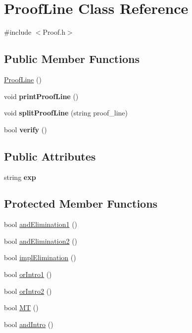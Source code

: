 \hypertarget{classProofLine}{}\section{Proof\+Line Class Reference}
\label{classProofLine}


{\ttfamily \#include $<$Proof.\+h$>$}

\subsection*{Public Member Functions}
\begin{DoxyCompactItemize}
\item 
\hyperlink{classProofLine_aed683fe67d959f3b95f8975e80b23d66}{Proof\+Line} ()
\item 
\mbox{\label{classProofLine_a3513b1868553c12d6f543d2ac52128d0}} 
void {\bfseries print\+Proof\+Line} ()
\item 
\mbox{\label{classProofLine_a0852f21558cab79bdcaec616afdb02c0}} 
void {\bfseries split\+Proof\+Line} (string proof\+\_\+line)
\item 
\mbox{\label{classProofLine_a6f98427e3d814f8d122e729a427afeee}} 
bool {\bfseries verify} ()
\end{DoxyCompactItemize}
\subsection*{Public Attributes}
\begin{DoxyCompactItemize}
\item 
\mbox{\label{classProofLine_a7e1c27891418bad97d7e0ead18438973}} 
string {\bfseries exp}
\end{DoxyCompactItemize}
\subsection*{Protected Member Functions}
\begin{DoxyCompactItemize}
\item 
bool \hyperlink{classProofLine_a43b9c81f4f9be5f00343f5145110e075}{and\+Elimination1} ()
\item 
bool \hyperlink{classProofLine_a0bda4d97d283bf87f0c97415ede20e37}{and\+Elimination2} ()
\item 
bool \hyperlink{classProofLine_ae5ea0ef5e9c41064af3d8578af1f8da0}{impl\+Elimination} ()
\item 
bool \hyperlink{classProofLine_aec5ed54b54b88fb6e1a28dc81e95c670}{or\+Intro1} ()
\item 
bool \hyperlink{classProofLine_af445475b7ba7083bc67b3066dbfefc95}{or\+Intro2} ()
\item 
bool \hyperlink{classProofLine_abbc92e738aea8f3aa60a2b252ebfb9c6}{MT} ()
\item 
bool \hyperlink{classProofLine_ac6f66fe3b8cc3d99b120c6cfc74f34b4}{and\+Intro} ()
\end{DoxyCompactItemize}
